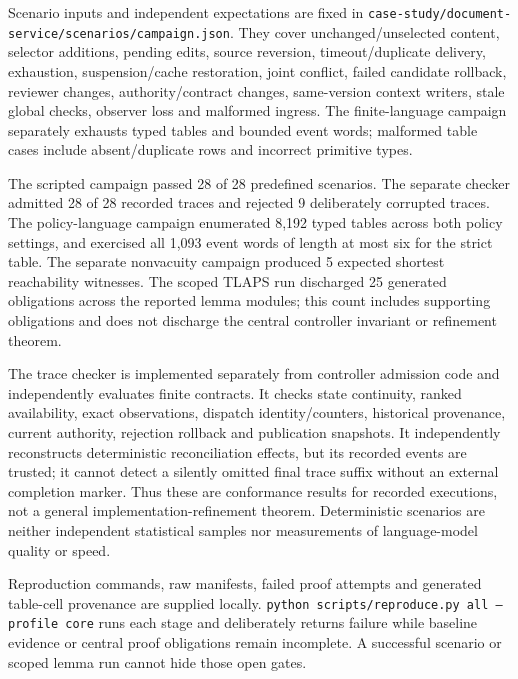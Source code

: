 \documentclass[pdflatex,sn-mathphys-num]{sn-jnl}
\theoremstyle{thmstyleone}
\theoremstyle{thmstylethree}
\theoremstyle{thmstyletwo}
\begin{document}
Scenario inputs and independent expectations are fixed in \texttt{case-study/document-service/scenarios/campaign.json}. They cover unchanged/unselected content, selector additions, pending edits, source reversion, timeout/duplicate delivery, exhaustion, suspension/cache restoration, joint conflict, failed candidate rollback, reviewer changes, authority/contract changes, same-version context writers, stale global checks, observer loss and malformed ingress. The finite-language campaign separately exhausts typed tables and bounded event words; malformed table cases include absent/duplicate rows and incorrect primitive types.

The scripted campaign passed 28 of 28 predefined scenarios. The separate checker admitted 28 of 28 recorded traces and rejected 9 deliberately corrupted traces. The policy-language campaign enumerated 8,192 typed tables across both policy settings, and exercised all 1,093 event words of length at most six for the strict table. The separate nonvacuity campaign produced 5 expected shortest reachability witnesses. The scoped TLAPS run discharged 25 generated obligations across the reported lemma modules; this count includes supporting obligations and does not discharge the central controller invariant or refinement theorem.

The trace checker is implemented separately from controller admission code and independently evaluates finite contracts. It checks state continuity, ranked availability, exact observations, dispatch identity/counters, historical provenance, current authority, rejection rollback and publication snapshots. It independently reconstructs deterministic reconciliation effects, but its recorded events are trusted; it cannot detect a silently omitted final trace suffix without an external completion marker. Thus these are conformance results for recorded executions, not a general implementation-refinement theorem. Deterministic scenarios are neither independent statistical samples nor measurements of language-model quality or speed.

Reproduction commands, raw manifests, failed proof attempts and generated table-cell provenance are supplied locally. \texttt{python scripts/reproduce.py all --profile core} runs each stage and deliberately returns failure while baseline evidence or central proof obligations remain incomplete. A successful scenario or scoped lemma run cannot hide those open gates.

\end{document}
